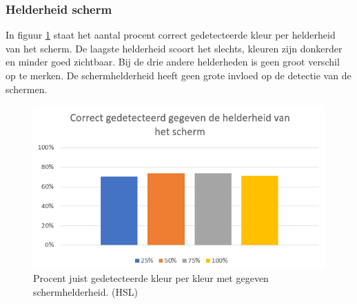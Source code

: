 \subsubsection{Helderheid scherm}
In figuur \ref{fig:helderheid} staat het aantal procent correct gedetecteerde kleur per helderheid van het scherm. De laagste helderheid scoort het slechts, kleuren zijn donkerder en minder goed zichtbaar. Bij de drie andere helderheden is geen groot verschil op te merken. De schermhelderheid heeft geen grote invloed op de detectie van de schermen.
\begin{figure}
	\centering
	\includegraphics[scale=0.7]{img/brightness}
	\caption{Procent juist gedetecteerde kleur per kleur met gegeven schermhelderheid. (HSL)}
	\label{fig:helderheid}
\end{figure}
